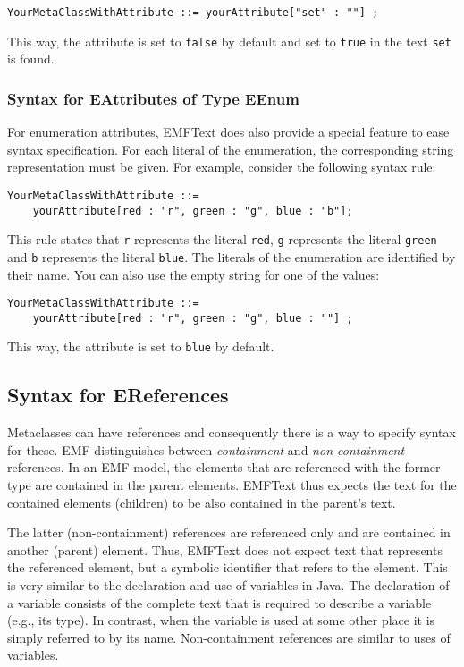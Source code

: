 \begin{lstlisting}
YourMetaClassWithAttribute ::= yourAttribute["set" : ""] ;
\end{lstlisting}

This way, the attribute is set to \texttt{false} by default and set to
\texttt{true} in the text \texttt{set} is found.

\subsubsection{Syntax for EAttributes of Type EEnum}

For enumeration attributes, EMFText does also provide a special feature to ease
syntax specification. For each literal of the enumeration, the corresponding
string representation must be given. For example, consider the following
syntax rule:

\begin{lstlisting}
YourMetaClassWithAttribute ::= 
    yourAttribute[red : "r", green : "g", blue : "b"];
\end{lstlisting}

This rule states that \texttt{r} represents the literal \texttt{red},
\texttt{g} represents the literal \texttt{green} and \texttt{b} represents the
literal \texttt{blue}. The literals of the enumeration are identified by their
name. You can also use the empty string for one of the values:

\begin{lstlisting}
YourMetaClassWithAttribute ::= 
    yourAttribute[red : "r", green : "g", blue : ""] ;
\end{lstlisting}

This way, the attribute is set to \texttt{blue} by default.

\subsection{Syntax for EReferences}

Metaclasses can have references and consequently there is a way to specify 
syntax for these. EMF distinguishes between \emph{containment} and
\emph{non-containment} references. In an EMF model, the elements that are
referenced with the former type are contained in the parent elements. EMFText
thus expects the text for the contained elements (children) to be also 
contained in the parent's text. 

The latter (non-containment) references are referenced only and are contained in
another (parent) element. Thus, EMFText does not expect text that
represents the referenced element, but a symbolic identifier that refers
to the element. This is very similar to the declaration and use of variables in Java.
The declaration of a variable consists of the complete text that is required to
describe a variable (e.g., its type). In contrast, when the variable is used at
some other place it is simply referred to by its name. Non-containment
references are similar to uses of variables.

